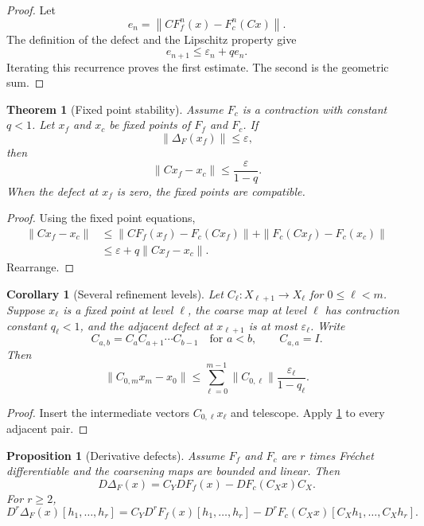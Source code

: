 \documentclass[11pt,a4paper]{article}
\newtheorem{theorem}{Theorem}[section]
\theoremstyle{plain}
\newtheorem{proposition}[proposition]{Proposition}
\newtheorem{corollary}[corollary]{Corollary}
\theoremstyle{definition}
\theoremstyle{remark}
\begin{document}
\begin{proof}
Let
\[
e_n=\left\|CF_f^n(x)-F_c^n(Cx)\right\|.
\]
The definition of the defect and the Lipschitz property give
\[
e_{n+1}\le\varepsilon_n+qe_n.
\]
Iterating this recurrence proves the first estimate.  The second is the geometric sum.
\end{proof}

\begin{theorem}[Fixed point stability]\label{thm:fixed_point_stability}
Assume $F_c$ is a contraction with constant $q<1$.  Let $x_f$ and $x_c$ be fixed points of $F_f$ and $F_c$.  If
\[
\|\Delta_F(x_f)\|\le\varepsilon,
\]
then
\[
\|Cx_f-x_c\|
\le
\frac{\varepsilon}{1-q}.
\]
When the defect at $x_f$ is zero, the fixed points are compatible.
\end{theorem}

\begin{proof}
Using the fixed point equations,
\[
\begin{aligned}
\|Cx_f-x_c\|
&\le
\|CF_f(x_f)-F_c(Cx_f)\|
+
\|F_c(Cx_f)-F_c(x_c)\|\\
&\le
\varepsilon+q\|Cx_f-x_c\|.
\end{aligned}
\]
Rearrange.
\end{proof}

\begin{corollary}[Several refinement levels]\label{cor:multilevel_fixed_points}
Let $C_\ell:X_{\ell+1}\to X_\ell$ for $0\le\ell<m$.  Suppose $x_\ell$ is a fixed point at level $\ell$, the coarse map at level $\ell$ has contraction constant $q_\ell<1$, and the adjacent defect at $x_{\ell+1}$ is at most $\varepsilon_\ell$.  Write
\[
C_{a,b}=C_aC_{a+1}\cdots C_{b-1}
\quad\text{for }a<b,
\qquad
C_{a,a}=I.
\]
Then
\[
\|C_{0,m}x_m-x_0\|
\le
\sum_{\ell=0}^{m-1}
\|C_{0,\ell}\|
\frac{\varepsilon_\ell}{1-q_\ell}.
\]
\end{corollary}

\begin{proof}
Insert the intermediate vectors $C_{0,\ell}x_\ell$ and telescope.  Apply \cref{thm:fixed_point_stability} to every adjacent pair.
\end{proof}

\begin{proposition}[Derivative defects]\label{prop:derivative_defects}
Assume $F_f$ and $F_c$ are $r$ times Fr\'echet differentiable and the coarsening maps are bounded and linear.  Then
\[
D\Delta_F(x)
=
C_YDF_f(x)-DF_c(C_Xx)C_X.
\]
For $r\ge2$,
\[
D^r\Delta_F(x)[h_1,\ldots,h_r]
=
C_YD^rF_f(x)[h_1,\ldots,h_r]
-
D^rF_c(C_Xx)[C_Xh_1,\ldots,C_Xh_r].
\]
\end{proposition}
\end{document}
